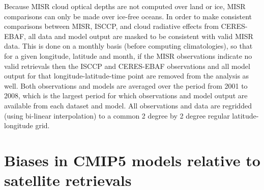 Because MISR cloud optical depths are not computed over land or ice,
MISR comparisons can only be made over ice-free oceans. In order to make
consistent comparisons between MISR, ISCCP, and cloud radiative effects
from CERES-EBAF, all data and model output are masked to be consistent
with valid MISR data. This is done on a monthly basis (before computing
climatologies), so that for a given longitude, latitude and month, if
the MISR observations indicate no valid retrievals then the ISCCP and
CERES-EBAF observations and all model output for that
longitude-latitude-time point are removed from the analysis as well.
Both observations and models are averaged over the period from 2001 to
2008, which is the largest period for which observations and model
output are available from each dataset and model. All observations and
data are regridded (using bi-linear interpolation) to a common 2 degree
by 2 degree regular latitude-longitude grid.

\section{Biases in CMIP5 models relative to satellite
retrievals}\label{biases-in-cmip5-models-relative-to-satellite-retrievals}

